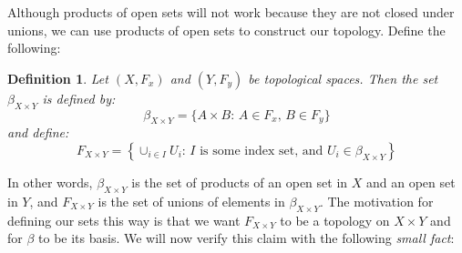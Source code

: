 \documentclass[reqno]{amsart}
\newtheorem{definition}[theorem]{Definition}
\begin{document}
Although products of open sets will not work because they are not closed under unions, we can use products of open sets to construct our topology. Define the following:
\begin{definition}
Let $(X,F_x)$ and $(Y,F_y)$ be topological spaces. Then the set $\beta_{X\times Y}$ is defined by:
\[\beta_{X\times Y} = \{A\times B:\,A\in F_x,\,B\in F_y\}\]
and define:
\[F_{X\times Y} = \left\{\cup_{i\in I} U_i:\,I \text{ is some index set, and }U_i\in \beta_{X\times Y}\right\}\]
\end{definition}
In other words, $\beta_{X\times Y}$ is the set of products of an open set in $X$ and an open set in $Y$, and $F_{X\times Y}$ is the set of unions of elements in $\beta_{X\times Y}$. The motivation for defining our sets this way is that we want $F_{X\times Y}$ to be a topology on $X\times Y$ and for $\beta$ to be its basis. We will now verify this claim with the following \emph{small fact}:
\end{document}
